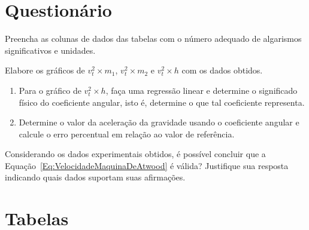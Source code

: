 \vspace{5mm}

\section{Questionário}

\begin{question}[type={exam}]{2}
Preencha as colunas de dados das tabelas com o número adequado de algarismos significativos e unidades.
\end{question}

\begin{question}[type={exam}]{3}
Elabore os gráficos de $v_t^2 \times m_1$, $v_t^2 \times m_2$ e $v_t^2 \times h$ com os dados obtidos.
\end{question}

\begin{question}[type={exam}]{2}
\begin{enumerate}[label=\roman*.]
\item Para o gráfico de $v_t^2 \times h$, faça uma regressão linear e determine o significado físico do coeficiente angular, isto é, determine o que tal coeficiente representa.
\item Determine o valor da aceleração da gravidade usando o coeficiente angular e calcule o erro percentual em relação ao valor de referência.
\end{enumerate}
\end{question}

\begin{question}[type={exam}]{3}
Considerando os dados experimentais obtidos, é possível concluir que a Equação~\eqref{Eq:VelocidadeMaquinaDeAtwood} é válida? Justifique sua resposta indicando quais dados suportam suas afirmações.
\end{question}

\vfill
\pagebreak
\section{Tabelas}

